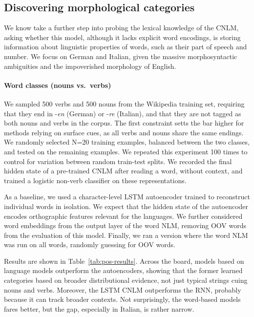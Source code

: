 \subsection{Discovering morphological categories}
\label{sec:categories}

We know take a further step into probing the lexical knowledge of the
CNLM, asking whether this model, although it lacks explicit word
encodings, is storing information about linguistic properties of
words, such as their part of speech and number. We focus on German and
Italian, given the massive morphosyntactic ambiguities and the
impoverished morphology of English.

\paragraph{Word classes (nouns vs.~verbs)}

We sampled 500 verbs and 500 nouns from the Wikipedia training set,
requiring that they end in -\emph{en} (German) or -\emph{re}
(Italian), and that they are not tagged as both nouns and verbs in the
corpus. The first constraint setts the bar higher for methods relying
on surface cues, as all verbs and nouns share the same endings. We
randomly selected N=20 training examples, balanced between the two
classes, and tested on the remaining examples.  We repeated this
experiment 100 times to control for variation between random
train-test splits. We recorded the final hidden state of a pre-trained
CNLM after reading a word, without context, and trained a logistic
non-verb classifier on these representations.

As a baseline, we used a character-level LSTM autoencoder trained to
reconstruct individual words in isolation.  We expect that the hidden
state of the autoencoder encodes orthographic features relevant for
the languages.  We further considered word embeddings from the output
layer of the word NLM, removing OOV words from the evaluation of this
model. Finally, we ran a version where the word NLM was run on all words,
randomly guessing for OOV words.

Results are shown in Table~\ref{tab:pos-results}.  Across the board,
models based on language models outperform the autoencoders, showing
that the former learned categories based on broader distributional
evidence, not just typical strings cuing nouns and verbs. Moreover,
the LSTM CNLM outperforms the RNN, probably because it can track
broader contexts. Not surprisingly, the word-based models fares
better, but the gap, especially in Italian, is rather narrow.

